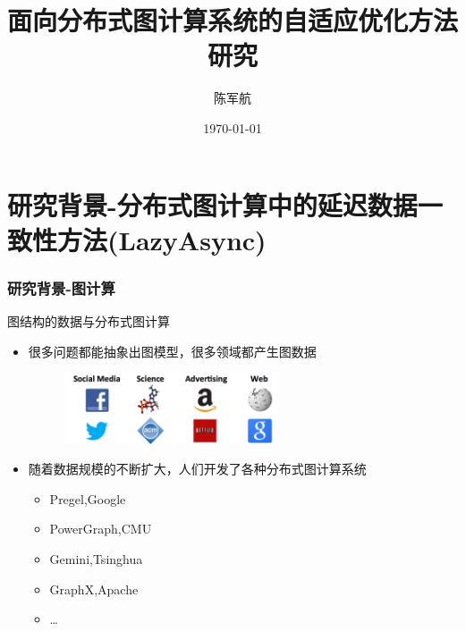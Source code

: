 \documentclass[10pt]{beamer}
\title{面向分布式图计算系统的自适应优化方法研究}
\author[Junhang Chen]{陈军航}
\date{\today}
\begin{document}
  
\begin{frame}%
  \titlepage
\end{frame}

\begin{frame}%
  \begin{center}
  \begin{varwidth}{\textwidth}
  \tableofcontents[sectionstyle=show,subsectionstyle=show] 
  \end{varwidth}
  \end{center}
\end{frame}

\section{研究背景-分布式图计算中的延迟数据一致性方法(LazyAsync)}


\begin{frame}%
  \frametitle{研究背景-图计算}
    \begin{block}
      {图结构的数据与分布式图计算}
      \begin{itemize}
        \item 很多问题都能抽象出图模型，很多领域都产生图数据
        \begin{figure}[!htbp]
          \centering
          \includegraphics[width=0.60\textwidth]{Img/graphs_are_everywhere.png}
          \label{fig:graph_important}
        \end{figure}
      \end{itemize}
      \begin{itemize}
        \item 随着数据规模的不断扩大，人们开发了各种分布式图计算系统
        \begin{itemize}
          \item Pregel,Google
          \item PowerGraph,CMU
          \item Gemini,Tsinghua
          \item GraphX,Apache
          \item \ldots 
        \end{itemize}
      \end{itemize}
    \end{block}
\end{frame}
\end{document}
